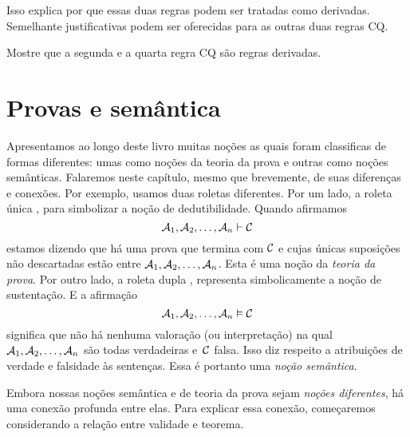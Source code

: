 \begin{fitchproof}
	\open
		\open
		\close
	\close
\end{fitchproof}
Isso explica por que essas duas regras podem ser tratadas como derivadas. Semelhante justificativas podem ser oferecidas para as outras duas regras CQ.

\practiceproblems

\problempart
Mostre que a segunda e a quarta regra  CQ são regras derivadas.


\chapter{Provas e semântica}

Apresentamos ao longo deste livro muitas noções as quais foram classificas de formas diferentes: umas como noções da teoria da prova e outras como  noções semânticas.  Falaremos neste capítulo, mesmo que brevemente, de suas diferenças  e conexões. 
Por exemplo, usamos duas roletas diferentes.  Por um lado, a roleta única  \proves,  para simbolizar a noção de dedutibilidade. Quando afirmamos 
$$\mathcal{A}_1, \mathcal{A}_2, \ldots, \mathcal{A}_n \vdash \mathcal{C}$$
estamos dizendo que há uma prova que termina com $\mathcal{C}$ e cujas únicas suposições não descartadas estão entre  $\mathcal{A}_1, \mathcal{A}_2, \ldots, \mathcal{A}_n$. Esta é uma noção da \emph{teoria da prova}.   Por outro lado,  a roleta  dupla  \entails, representa simbolicamente a noção de sustentação. E a afirmação 
$$\mathcal{A}_1, \mathcal{A}_2, \ldots, \mathcal{A}_n \vDash \mathcal{C}$$
significa que não há nenhuma valoração (ou interpretação) na qual  $\mathcal{A}_1, \mathcal{A}_2, \ldots, \mathcal{A}_n$ são todas verdadeiras e~$\mathcal{C}$ falsa. Isso diz respeito a atribuições de verdade e falsidade às sentenças. Essa é portanto uma \emph{noção semântica}.

Embora nossas noções semântica e de teoria da prova sejam \emph{noções diferentes}, há uma conexão profunda entre elas. Para explicar essa conexão, começaremos considerando a relação entre validade  e teorema.

